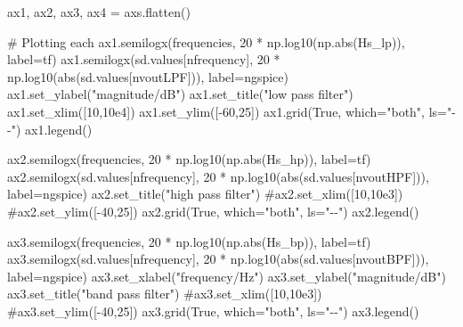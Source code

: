 \documentclass[
  letterpaper,
]{scrbook}
\newenvironment{Shaded}{}{}
\newcommand{\BuiltInTok}[1]{\textcolor[rgb]{0.84,0.23,0.29}{#1}}
\newcommand{\CommentTok}[1]{\textcolor[rgb]{0.42,0.45,0.49}{#1}}
\newcommand{\DecValTok}[1]{\textcolor[rgb]{0.00,0.36,0.77}{#1}}
\newcommand{\FloatTok}[1]{\textcolor[rgb]{0.00,0.36,0.77}{#1}}
\newcommand{\NormalTok}[1]{\textcolor[rgb]{0.14,0.16,0.18}{#1}}
\newcommand{\OperatorTok}[1]{\textcolor[rgb]{0.14,0.16,0.18}{#1}}
\newcommand{\StringTok}[1]{\textcolor[rgb]{0.01,0.18,0.38}{#1}}
\newcommand{\VariableTok}[1]{\textcolor[rgb]{0.89,0.38,0.04}{#1}}
\begin{document}
\begin{codelisting}
{\begin{Shaded}
\begin{Highlighting}[]
\NormalTok{ax1, ax2, ax3, ax4 }\OperatorTok{=}\NormalTok{ axs.flatten()}

\CommentTok{\# Plotting each}
\NormalTok{ax1.semilogx(frequencies, }\DecValTok{20} \OperatorTok{*}\NormalTok{ np.log10(np.}\BuiltInTok{abs}\NormalTok{(Hs\_lp)), label}\OperatorTok{=}\StringTok{\textquotesingle{}tf\textquotesingle{}}\NormalTok{)}
\NormalTok{ax1.semilogx(sd.values[nfrequency], }\DecValTok{20} \OperatorTok{*}\NormalTok{ np.log10(}\BuiltInTok{abs}\NormalTok{(sd.values[nvoutLPF])), label}\OperatorTok{=}\StringTok{\textquotesingle{}ngspice\textquotesingle{}}\NormalTok{)}
\NormalTok{ax1.set\_ylabel(}\StringTok{"magnitude/dB"}\NormalTok{)}
\NormalTok{ax1.set\_title(}\StringTok{"low pass filter"}\NormalTok{)}
\NormalTok{ax1.set\_xlim([}\DecValTok{10}\NormalTok{,}\FloatTok{10e4}\NormalTok{])}
\NormalTok{ax1.set\_ylim([}\OperatorTok{{-}}\DecValTok{60}\NormalTok{,}\DecValTok{25}\NormalTok{])}
\NormalTok{ax1.grid(}\VariableTok{True}\NormalTok{, which}\OperatorTok{=}\StringTok{"both"}\NormalTok{, ls}\OperatorTok{=}\StringTok{"{-}{-}"}\NormalTok{)}
\NormalTok{ax1.legend()}

\NormalTok{ax2.semilogx(frequencies, }\DecValTok{20} \OperatorTok{*}\NormalTok{ np.log10(np.}\BuiltInTok{abs}\NormalTok{(Hs\_hp)), label}\OperatorTok{=}\StringTok{\textquotesingle{}tf\textquotesingle{}}\NormalTok{)}
\NormalTok{ax2.semilogx(sd.values[nfrequency], }\DecValTok{20} \OperatorTok{*}\NormalTok{ np.log10(}\BuiltInTok{abs}\NormalTok{(sd.values[nvoutHPF])), label}\OperatorTok{=}\StringTok{\textquotesingle{}ngspice\textquotesingle{}}\NormalTok{)}
\NormalTok{ax2.set\_title(}\StringTok{"high pass filter"}\NormalTok{)}
\CommentTok{\#ax2.set\_xlim([10,10e3])}
\CommentTok{\#ax2.set\_ylim([{-}40,25])}
\NormalTok{ax2.grid(}\VariableTok{True}\NormalTok{, which}\OperatorTok{=}\StringTok{"both"}\NormalTok{, ls}\OperatorTok{=}\StringTok{"{-}{-}"}\NormalTok{)}
\NormalTok{ax2.legend()}

\NormalTok{ax3.semilogx(frequencies, }\DecValTok{20} \OperatorTok{*}\NormalTok{ np.log10(np.}\BuiltInTok{abs}\NormalTok{(Hs\_bp)), label}\OperatorTok{=}\StringTok{\textquotesingle{}tf\textquotesingle{}}\NormalTok{)}
\NormalTok{ax3.semilogx(sd.values[nfrequency], }\DecValTok{20} \OperatorTok{*}\NormalTok{ np.log10(}\BuiltInTok{abs}\NormalTok{(sd.values[nvoutBPF])), label}\OperatorTok{=}\StringTok{\textquotesingle{}ngspice\textquotesingle{}}\NormalTok{)}
\NormalTok{ax3.set\_xlabel(}\StringTok{"frequency/Hz"}\NormalTok{)}
\NormalTok{ax3.set\_ylabel(}\StringTok{"magnitude/dB"}\NormalTok{)}
\NormalTok{ax3.set\_title(}\StringTok{"band pass filter"}\NormalTok{)}
\CommentTok{\#ax3.set\_xlim([10,10e3])}
\CommentTok{\#ax3.set\_ylim([{-}40,25])}
\NormalTok{ax3.grid(}\VariableTok{True}\NormalTok{, which}\OperatorTok{=}\StringTok{"both"}\NormalTok{, ls}\OperatorTok{=}\StringTok{"{-}{-}"}\NormalTok{)}
\NormalTok{ax3.legend()}


\end{Highlighting}
\end{Shaded}}
\end{codelisting}
\end{document}
